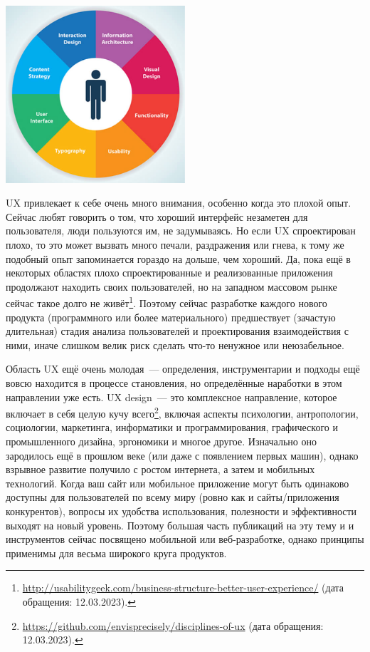 \documentclass{../../text-style}
\begin{document}
\begin{center}
    \includegraphics[width=0.5\textwidth]{uxComponents.png}
\end{center}

UX привлекает к себе очень много внимания, особенно когда это плохой опыт. Сейчас любят говорить о том, что хороший интерфейс незаметен для пользователя, люди пользуются им, не задумываясь. Но если UX спроектирован плохо, то это может вызвать много печали, раздражения или гнева, к тому же подобный опыт запоминается гораздо на дольше, чем хороший. Да, пока ещё в некоторых областях плохо спроектированные и реализованные приложения продолжают находить своих пользователей, но на западном массовом рынке сейчас такое долго не живёт\footnote{\url{http://usabilitygeek.com/business-structure-better-user-experience/} (дата обращения: 12.03.2023).}. Поэтому сейчас разработке каждого нового продукта (программного или более материального) предшествует (зачастую длительная) стадия анализа пользователей и проектирования взаимодействия с ними, иначе слишком велик риск сделать что-то ненужное или неюзабельное.

Область UX ещё очень молодая~--- определения, инструментарии и подходы ещё вовсю находится в процессе становления, но определённые наработки в этом направлении уже есть. UX design~--- это комплексное направление, которое включает в себя целую кучу всего\footnote{\url{https://github.com/envisprecisely/disciplines-of-ux} (дата обращения: 12.03.2023).}, включая аспекты психологии, антропологии, социологии, маркетинга, информатики и программирования, графического и промышленного дизайна, эргономики и многое другое. Изначально оно зародилось ещё в прошлом веке (или даже с появлением первых машин), однако взрывное развитие получило с ростом интернета, а затем и мобильных технологий. Когда ваш сайт или мобильное приложение могут быть одинаково доступны для пользователей по всему миру (ровно как и сайты/приложения конкурентов), вопросы их удобства использования, полезности и эффективности выходят на новый уровень. Поэтому большая часть публикаций на эту тему и и инструментов сейчас посвящено мобильной или веб-разработке, однако принципы применимы для весьма широкого круга продуктов.
\end{document}
